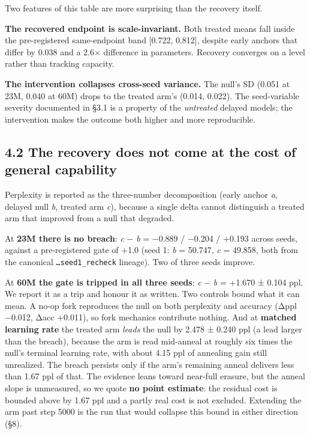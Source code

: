\documentclass[11pt]{article}
\begin{document}
Two features of this table are more surprising than the recovery itself.

\textbf{The recovered endpoint is scale-invariant.} Both treated means fall inside the
pre-registered same-endpoint band {[}0.722, 0.812{]}, despite early anchors that differ by
0.038 and a 2.6× difference in parameters. Recovery converges on a level rather than
tracking capacity.

\textbf{The intervention collapses cross-seed variance.} The null's SD (0.051 at 23M, 0.040 at
60M) drops to the treated arm's (0.014, 0.022). The seed-variable severity documented in
§3.1 is a property of the \emph{untreated} delayed models; the intervention makes the outcome
both higher and more reproducible.

\subsection{4.2 The recovery does not come at the cost of general capability}\label{the-recovery-does-not-come-at-the-cost-of-general-capability}

Perplexity is reported as the three-number decomposition (early anchor \emph{a}, delayed null
\emph{b}, treated arm \emph{c}), because a single delta cannot distinguish a treated arm that
improved from a null that degraded.

At \textbf{23M there is no breach}: \emph{c} − \emph{b} = −0.889 / −0.204 / +0.193 across seeds, against a
pre-registered gate of +1.0 (seed 1: \emph{b} = 50.747, \emph{c} = 49.858, both from the canonical
\texttt{…seed1\_recheck} lineage). Two of three seeds improve.

At \textbf{60M the gate is tripped in all three seeds}: \emph{c} − \emph{b} = +1.670 ± 0.104 ppl. We report
it as a trip and honour it as written. Two controls bound what it can mean. A no-op fork
reproduces the null on both perplexity and accuracy (Δppl −0.012, Δacc +0.011), so fork
mechanics contribute nothing. And at \textbf{matched learning rate} the treated arm \emph{leads} the
null by 2.478 ± 0.240 ppl (a lead larger than the breach), because the arm is read
mid-anneal at roughly six times the null's terminal learning rate, with about 4.15 ppl of
annealing gain still unrealized. The breach persists only if the arm's remaining anneal
delivers less than 1.67 ppl of that. The evidence leans toward near-full erasure, but the
anneal slope is unmeasured, so we quote \textbf{no point estimate}: the residual cost is bounded
above by 1.67 ppl and a partly real cost is not excluded. Extending the arm past step 5000
is the run that would collapse this bound in either direction (§8).
\end{document}
